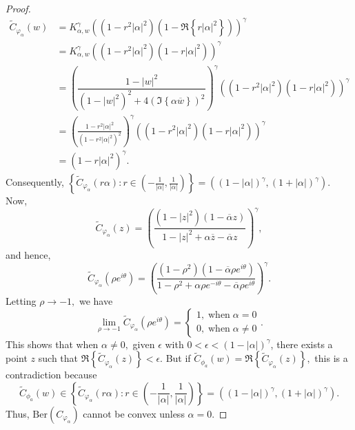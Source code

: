 \documentclass[12pt, reqno]{amsart}
\theoremstyle{definition}
\theoremstyle{remark}
\numberwithin{equation}{section}
\newcommand{\p}{\phi}
\begin{document}
\begin{proof}
       \begin{equation*}
           \begin{split}
               \widetilde{C}_{\varphi_\alpha}(w)&=K_{\alpha,w}^\gamma\left((1-r^2|\alpha|^2)\left(1-\Re\left\{r|\alpha|^2\right\}\right)\right)^\gamma\\
               &=K_{\alpha,w}^\gamma\left((1-r^2|\alpha|^2)\left(1-r|\alpha|^2\right)\right)^\gamma\\
               &=\left(\dfrac{1-|w|^2}{\left(1-|w|^2\right)^2+4\left(\Im\left\{\alpha\overline{w}\right\}\right)^2}\right)^\gamma\left((1-r^2|\alpha|^2)\left(1-r|\alpha|^2\right)\right)^\gamma\\
               &=\left(\frac{1-r^2|\alpha|^2}{\left(1-r^2|\alpha|^2\right)^2}\right)^\gamma\left((1-r^2|\alpha|^2)\left(1-r|\alpha|^2\right)\right)^\gamma\\
               &=\left(1-r|\alpha|^2\right)^\gamma.
           \end{split}
       \end{equation*}
       Consequently, $\left\{\widetilde{C}_{\varphi_\alpha}(r\alpha):r\in \left(-\frac{1}{|\alpha|},\frac{1}{|\alpha|}\right)\right\}=\left((1-|\alpha|)^\gamma,(1+|\alpha|)^\gamma\right)$.\\ Now,
       \begin{equation*}
           \widetilde{C}_{\varphi_\alpha}(z)=\left(\dfrac{\left(1-|z|^2\right)\left(1-\overline{\alpha}z\right)}{1-|z|^2+\alpha\overline{z}-\overline{\alpha}z}\right)^\gamma,
       \end{equation*}
       and hence,
       \begin{equation*}
           \widetilde{C}_{\varphi_\alpha}(\rho e^{i\theta})=\left(\frac{\left(1-\rho^2\right)\left(1-\overline{\alpha}\rho e^{i\theta}\right)}{1-\rho^2+\alpha\rho e^{-i\theta}-\overline{\alpha}\rho e^{i\theta}}\right)^\gamma.
       \end{equation*}
       Letting $\rho \rightarrow -1,$ we have
       \begin{equation*}
          \lim_{\rho \rightarrow -1}{\widetilde{C}_{\varphi_\alpha}(\rho e^{i\theta})}=\begin{cases}
              1,\;\mbox{when}\;\alpha=0\\
              0,\;\mbox{when}\;\alpha\neq 0
          \end{cases}.
       \end{equation*}
     This shows that when $\alpha\neq0,$ given $\epsilon$ with $0<\epsilon<(1-|\alpha|)^\gamma$, there exists a point $z$ such that $\Re\left\{\widetilde{C}_{\varphi_\alpha}(z)\right\}<\epsilon.$ But if $\widetilde{C}_{\p_a}(w)=\Re\left\{\widetilde{C}_{\varphi_\alpha}(z)\right\},$ this is a contradiction because $$\widetilde{C}_{\p_a}(w)\in \left\{\widetilde{C}_{\varphi_\alpha}(r\alpha):r\in \left(-\frac{1}{|\alpha|},\frac{1}{|\alpha|}\right)\right\}=\left((1-|\alpha|)^\gamma,(1+|\alpha|)^\gamma\right).$$ Thus, $\mbox{Ber}(C_{\varphi_\alpha})$ cannot be convex unless $\alpha=0$.      
\end{proof}
\end{document}

